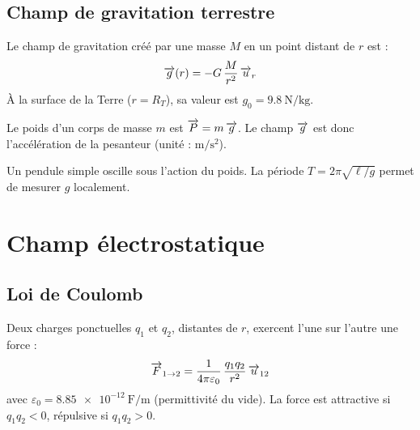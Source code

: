 \subsection{Champ de gravitation terrestre}

\begin{definition}
Le champ de gravitation créé par une masse $M$ en un point distant de $r$ est :
\[
\overrightarrow{g}(r) = -G\,\frac{M}{r^2}\,\overrightarrow{u}_r
\]
À la surface de la Terre ($r = R_T$), sa valeur est $g_0 = \SI{9.8}{\newton\per\kilogram}$.
\end{definition}

\begin{propriete}
Le poids d’un corps de masse $m$ est $\overrightarrow{P} = m\,\overrightarrow{g}$. Le champ $\overrightarrow{g}$ est donc l’accélération de la pesanteur (unité : $\si{\metre\per\second\squared}$).
\end{propriete}

\begin{experience}
Un pendule simple oscille sous l’action du poids. La période $T = 2\pi\sqrt{\ell/g}$ permet de mesurer $g$ localement.
\end{experience}

\begin{illus}
\end{illus}

\section{Champ électrostatique}

\subsection{Loi de Coulomb}

\begin{loi}[Coulomb]
Deux charges ponctuelles $q_1$ et $q_2$, distantes de $r$, exercent l’une sur l’autre une force :
\[
\overrightarrow{F}_{1\to2} = \frac{1}{4\pi\varepsilon_0}\,\frac{q_1 q_2}{r^2}\,\overrightarrow{u}_{12}
\]
avec $\varepsilon_0 = \SI{8.85e-12}{\farad\per\metre}$ (permittivité du vide). La force est attractive si $q_1 q_2 < 0$, répulsive si $q_1 q_2 > 0$.
\end{loi}


